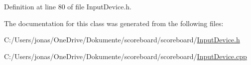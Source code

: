 Definition at line 80 of file Input\+Device.\+h.



The documentation for this class was generated from the following files\+:\begin{DoxyCompactItemize}
\item 
C\+:/\+Users/jonas/\+One\+Drive/\+Dokumente/scoreboard/scoreboard/\hyperlink{_input_device_8h}{Input\+Device.\+h}\item 
C\+:/\+Users/jonas/\+One\+Drive/\+Dokumente/scoreboard/scoreboard/\hyperlink{_input_device_8cpp}{Input\+Device.\+cpp}\end{DoxyCompactItemize}
